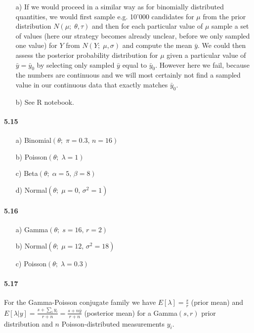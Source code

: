 \documentclass[fontsize=11pt,DIV=18,parskip=half]{scrartcl}
\begin{document}
\begin{enumerate}
\item[a)] If we would proceed in a similar way as for binomially distributed quantities, we would first sample e.g. 10'000 candidates for $\mu$ from the prior distribution $N(\mu; \; \theta, \tau)$ and then for each particular value of $\mu$ sample a set of values (here our strategy becomes already unclear, before we only sampled one value) for $Y$ from $N(Y; \; \mu, \sigma)$ and compute the mean $\bar{y}$. We could then assess the posterior probability distribution for $\mu$ given a particular value of $\bar{y}=\bar{y}_0$ by selecting only  sampled $\bar{y}$ equal to $\bar{y}_0$. However here we fail, because the numbers are continuous and we will most certainly not find a sampled value in our continuous data that exactly matches $\bar{y}_0$.
\item[b)] See R notebook.
\end{enumerate}

\paragraph{5.15}

\begin{enumerate}
\item[a)] Binomial$(\theta; \; \pi=0.3, \, n=16)$
\item[b)] Poisson$(\theta; \; \lambda=1)$
\item[c)] Beta$(\theta; \; \alpha=5, \, \beta=8)$
\item[d)] Normal$(\theta; \; \mu=0,\, \sigma^2=1)$
\end{enumerate}

\paragraph{5.16}

\begin{enumerate}
\item[a)] Gamma$(\theta; \; s=16, \, r=2)$
\item[b)] Normal$(\theta; \; \mu=12,\, \sigma^2=18)$
\item[c)] Poisson$(\theta; \; \lambda=0.3)$
\end{enumerate}

\paragraph{5.17}

For the Gamma-Poisson conjugate family we have $E[\lambda] = \frac{s}{r}$ (prior mean) and $E[\lambda|y] = \frac{s+\sum_i y_i}{r+n} = \frac{s+n\bar{y}}{r+n}$ (posterior mean) for a Gamma$(s,r)$ prior distribution and $n$ Poisson-distributed measurements $y_i$.
\end{document}

